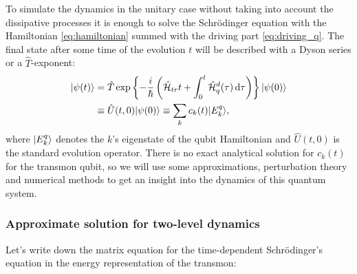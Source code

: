 \documentclass[12pt, twoside]{report}
\newcommand{\diff}{\,\mathrm{d}}
\DeclarePairedDelimiter\ket{\lvert}{\rangle}
\newcommand{\rbrkt}[1]{\left( #1 \right)}
\numberwithin{equation}{section}
\begin{document}
To simulate the dynamics in the unitary case without taking into account the dissipative processes it is enough to solve the Schrödinger equation with the Hamiltonian \eqref{eq:hamiltonian} summed with the driving part \eqref{eq:driving_q}. The final state after some time of the evolution $t$ will be described with a Dyson series or a $\hat T$-exponent:
\begin{equation}
\begin{aligned}
\ket{\psi (t)} &= \hat T \exp\left\{-\frac{i}{\hbar} \rbrkt{\mathcal{\hat H}_{tr}t + \int_0^t \mathcal{\hat H}_q^d(\tau) \diff\tau}\right\} \ket{\psi(0)}\\
&\equiv \hat U(t, 0) \ket{\psi(0)}\equiv \sum_k c_k(t) \ket{E^q_k},
\end{aligned}
\label{eq:dyson}
\end{equation} 
where $\ket{E_k^q}$ denotes the $k$'s eigenstate of the qubit Hamiltonian and $\hat U(t, 0)$ is the standard evolution operator. There is no exact analytical solution for $c_k(t)$ for the transmon qubit, so we will use some approximations, perturbation theory and numerical methods to get an insight into the dynamics of this quantum system.

\subsubsection{Approximate solution for two-level dynamics}

Let's write down the matrix equation for the time-dependent Schrödinger's equation in the energy representation of the transmon:
\end{document}
